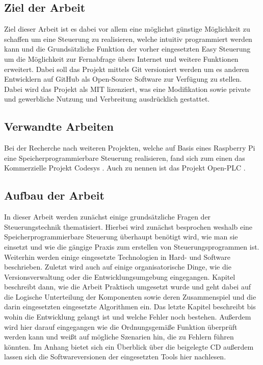\subsection{Ziel der Arbeit}
Ziel dieser Arbeit ist es dabei vor allem eine möglichst günstige Möglichkeit zu schaffen um eine Steuerung zu realisieren, welche intuitiv programmiert werden kann und die Grundsätzliche Funktion der vorher eingesetzten Easy Steuerung um die Möglichkeit zur Fernabfrage übers Internet und weitere Funktionen erweitert. Dabei soll das Projekt mittels Git versioniert werden um es anderen Entwicklern auf GitHub als Open-Source Software zur Verfügung zu stellen. Dabei wird das Projekt als MIT lizenziert, was eine Modifikation sowie private und gewerbliche Nutzung und Verbreitung ausdrücklich gestattet. 
\subsection{Verwandte Arbeiten}
Bei der Recherche nach weiteren Projekten, welche auf Basis eines Raspberry Pi eine Speicherprogrammierbare Steuerung realisieren, fand sich zum einen das Kommerzielle Projekt Codesys \cite{URL:Codesys}. Auch zu nennen ist das Projekt Open-PLC \cite{URL:OpenPLC}. 
\subsection{Aufbau der Arbeit}
In dieser Arbeit werden zunächst einige grundsätzliche Fragen der Steuerungstechnik thematisiert. Hierbei wird zunächst besprochen weshalb eine Speicherprogrammierbare Steuerung überhaupt benötigt wird, wie man sie einsetzt und wie die gängige Praxis zum erstellen von Steuerungsprogrammen ist. Weiterhin werden einige eingesetzte Technologien in Hard- und Software beschrieben. Zuletzt wird auch auf einige organisatorische Dinge, wie die Versionsverwaltung oder die Entwicklungsumgebung eingegangen. Kapitel  beschreibt dann, wie die Arbeit Praktisch umgesetzt wurde und geht dabei auf die Logische Unterteilung der Komponenten sowie deren Zusammenspiel und die darin eingesetzten eingesetzte Algorithmen ein. Das letzte Kapitel beschreibt bis wohin die Entwicklung gelangt ist und welche Fehler noch bestehen. Außerdem wird hier darauf eingegangen wie die Ordnungsgemäße Funktion überprüft werden kann und weißt auf mögliche Szenarien hin, die zu Fehlern führen könnten. Im Anhang bietet sich ein Überblick über die beigelegte CD außerdem lassen sich die Softwareversionen der eingesetzten Tools hier nachlesen.

\clearpage
